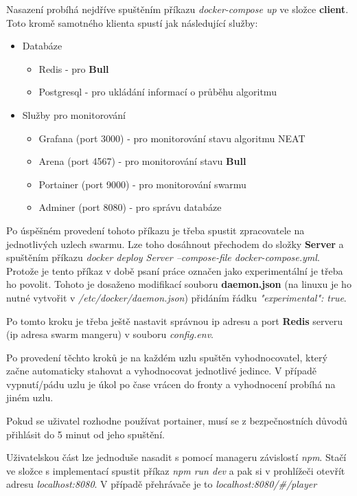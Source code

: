 Nasazení probíhá nejdříve spuštěním příkazu \emph{docker-compose up} ve složce \textbf{client}. Toto kromě samotného klienta spustí jak následující služby:
\begin{itemize}
	\item Databáze
	\begin{itemize}
		\item Redis - pro \textbf{Bull}
		\item Postgresql - pro ukládání informací o průběhu algoritmu
	\end{itemize}
	\item Služby pro monitorování
	\begin{itemize}
		\item Grafana (port 3000) - pro monitorování stavu algoritmu NEAT
		\item Arena (port 4567) - pro monitorování stavu \textbf{Bull}
		\item Portainer (port 9000) - pro monitorování swarmu
		\item Adminer (port 8080) - pro správu databáze
	\end{itemize}
\end{itemize}
Po úspěšném provedení tohoto příkazu je třeba spustit zpracovatele na jednotlivých uzlech swarmu. Lze toho dosáhnout přechodem do složky \textbf{Server} a spuštěním příkazu \emph{docker deploy Server --compose-file docker-compose.yml}. Protože je tento příkaz v době psaní práce označen jako experimentální je třeba ho povolit. Tohoto je dosaženo modifikací souboru \textbf{daemon.json} (na linuxu je ho nutné vytvořit v \emph{/etc/docker/daemon.json}) přidáním řádku \emph{"experimental": true}.

Po tomto kroku je třeba ještě nastavit správnou ip adresu a port \textbf{Redis} serveru (ip adresa swarm mangeru) v souboru \emph{config.env}.

Po provedení těchto kroků je na každém uzlu spuštěn vyhodnocovatel, který začne automaticky stahovat a vyhodnocovat jednotlivé jedince. V případě vypnutí/pádu uzlu je úkol po čase vrácen do fronty a vyhodnocení probíhá na jiném uzlu.

Pokud se uživatel rozhodne používat portainer, musí se z bezpečnostních důvodů přihlásit do 5 minut od jeho spuštění.

Uživatelskou část lze jednoduše nasadit s pomocí manageru závislostí \emph{npm}. Stačí ve složce s implementací spustit příkaz \emph{npm run dev} a pak si v prohlížeči otevřít adresu \emph{localhost:8080}. V případě přehrávače je to \emph{localhost:8080/\#/player}


